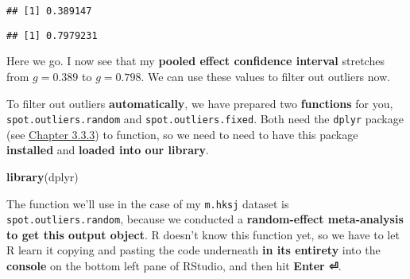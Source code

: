 \documentclass[]{book}
\newenvironment{Shaded}{\begin{snugshade}}{\end{snugshade}}
\newcommand{\KeywordTok}[1]{\textcolor[rgb]{0.13,0.29,0.53}{\textbf{#1}}}
\newcommand{\OperatorTok}[1]{\textcolor[rgb]{0.81,0.36,0.00}{\textbf{#1}}}
\newcommand{\NormalTok}[1]{#1}
\theoremstyle{definition}
\theoremstyle{definition}
\theoremstyle{definition}
\theoremstyle{remark}
\begin{document}
\begin{Shaded}
\end{Shaded}

\begin{verbatim}
## [1] 0.389147
\end{verbatim}

\begin{Shaded}
\end{Shaded}

\begin{verbatim}
## [1] 0.7979231
\end{verbatim}

Here we go. I now see that my \textbf{pooled effect confidence interval}
stretches from \(g = 0.389\) to \(g = 0.798\). We can use these values
to filter out outliers now.

To filter out outliers \textbf{automatically}, we have prepared two
\textbf{functions} for you, \texttt{spot.outliers.random} and
\texttt{spot.outliers.fixed}. Both need the \texttt{dplyr} package (see
\protect\hyperlink{select}{Chapter 3.3.3}) to function, so we need to
need to have this package \textbf{installed} and \textbf{loaded into our
library}.

\begin{Shaded}
\begin{Highlighting}[]
\KeywordTok{library}\NormalTok{(dplyr)}
\end{Highlighting}
\end{Shaded}

The function we'll use in the case of my \texttt{m.hksj} dataset is
\texttt{spot.outliers.random}, because we conducted a
\textbf{random-effect meta-analysis to get this output object}. R
doesn't know this function yet, so we have to let R learn it copying and
pasting the code underneath \textbf{in its entirety} into the
\textbf{console} on the bottom left pane of RStudio, and then hit
\textbf{Enter ⏎}.
\end{document}
